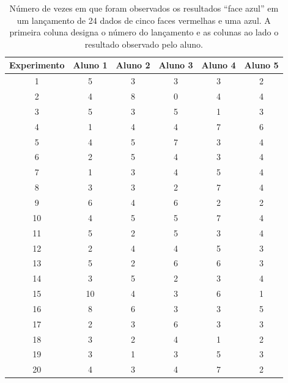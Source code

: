 \documentclass[12pt, a4paper, brazil]{article}
\begin{document}
\begin{table}[ht!]
	\centering

	\caption{Número de vezes em que foram observados os resultados “face
		azul” em um lançamento de 24 dados de cinco faces vermelhas e uma
		azul. A primeira coluna designa o número do lançamento e as colunas
		ao lado o resultado observado pelo aluno.}

	\begin{tabular}{c c c c c c}
		\hline
		Experimento & Aluno 1 & Aluno 2 & Aluno 3 & Aluno 4 & Aluno 5 \\
		\hline
		1           & 5       & 3       & 3       & 3       & 2       \\
		2           & 4       & 8       & 0       & 4       & 4       \\
		3           & 5       & 3       & 5       & 1       & 3       \\
		4           & 1       & 4       & 4       & 7       & 6       \\
		5           & 4       & 5       & 7       & 3       & 4       \\
		6           & 2       & 5       & 4       & 3       & 4       \\
		7           & 1       & 3       & 4       & 5       & 4       \\
		8           & 3       & 3       & 2       & 7       & 4       \\
		9           & 6       & 4       & 6       & 2       & 2       \\
		10          & 4       & 5       & 5       & 7       & 4       \\
		11          & 5       & 2       & 5       & 3       & 4       \\
		12          & 2       & 4       & 4       & 5       & 3       \\
		13          & 5       & 2       & 6       & 6       & 3       \\
		14          & 3       & 5       & 2       & 3       & 4       \\
		15          & 10      & 4       & 3       & 6       & 1       \\
		16          & 8       & 6       & 3       & 3       & 5       \\
		17          & 2       & 3       & 6       & 3       & 3       \\
		18          & 3       & 2       & 4       & 1       & 2       \\
		19          & 3       & 1       & 3       & 5       & 3       \\
		20          & 4       & 3       & 4       & 7       & 2       \\
		\hline
	\end{tabular}
	\label{tab:experimentos}

\end{table}
\end{document}
